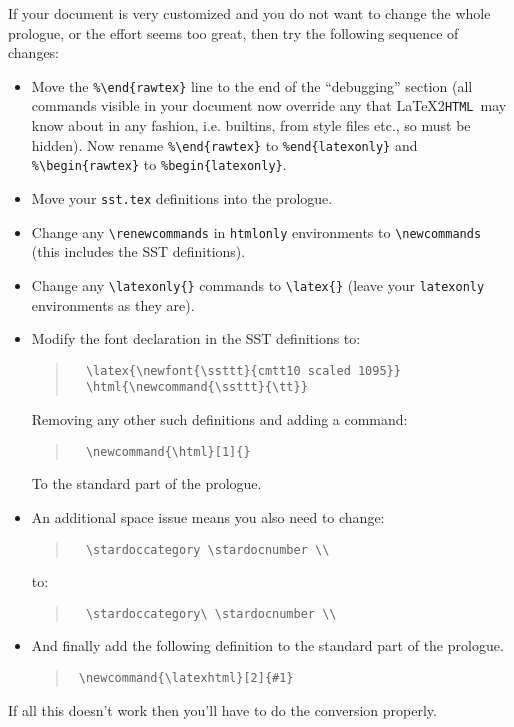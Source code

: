 \documentclass[twoside,11pt]{article}
\newcommand{\stardoccategory}  {Starlink User Note}
\newcommand{\stardocnumber}    {199.12}
\newcommand{\latex}[1]{#1}
\newcommand{\html}[1]{}
\newcommand{\latexhtml}[2]{#1}
\newcommand{\latextohtml}{\LaTeX2\texttt{HTML}}
\renewcommand{\_}{\texttt{\symbol{95}}}
\begin{document}
If your document is very customized and you do not want to change the whole
prologue, or the effort seems too great, then try the following sequence of
changes:
\begin{itemize}
\item Move the \verb#%#\verb#\end{rawtex}# line to the end of the
      ``debugging'' section (all commands visible in your document now
      override any that \latextohtml\ may know about in any fashion,
      i.e. builtins, from style files etc., so must be hidden). Now
      rename \verb#%#\verb#\end{rawtex}# to \verb#%#\verb#end{latexonly}#
      and \verb#%#\verb#\begin{rawtex}# to \verb#%#\verb#begin{latexonly}#.
\item Move your \verb#sst.tex# definitions into the prologue.
\item Change any \verb#\renewcommands# in \verb#htmlonly# environments
      to \verb#\newcommands# (this includes the SST definitions).
\item Change any \verb#\latexonly{}# commands to \verb#\latex{}# 
(leave your \verb#latexonly# environments as they are).
\item Modify the font declaration in the SST definitions to:
\begin{quote}
\begin{verbatim}
  \latex{\newfont{\ssttt}{cmtt10 scaled 1095}}
  \html{\newcommand{\ssttt}{\tt}}
\end{verbatim}
\end{quote}
Removing any other such definitions and adding a command:
\begin{quote}
\begin{verbatim}
  \newcommand{\html}[1]{}
\end{verbatim}
\end{quote}
To the standard part of the prologue. 
\item An additional space issue means you also need to change:
\begin{quote}
\begin{verbatim}
  \stardoccategory \stardocnumber \\
\end{verbatim}
\end{quote}
to:
\begin{quote}
\begin{verbatim}
  \stardoccategory\ \stardocnumber \\
\end{verbatim}
\end{quote}
\item And finally add the following definition to the standard part of 
      the prologue.
\begin{quote}
\begin{verbatim}
 \newcommand{\latexhtml}[2]{#1}
\end{verbatim}
\end{quote}
\end{itemize}
If all this doesn't work then you'll have to do the conversion properly.
\end{document}
